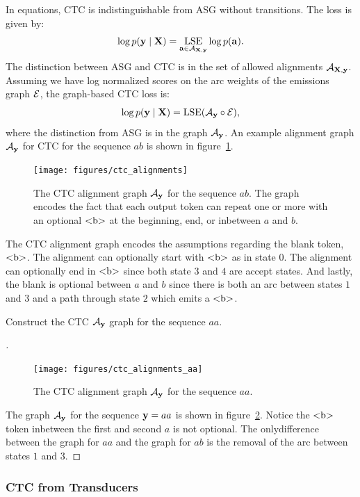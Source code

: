 In equations, CTC is indistinguishable from ASG without transitions. The loss
is given by:
$$
\log p({\bf y} \mid {\bf X}) = \operatorname*{\textrm{LSE}}_{{\bf a} \in \mathcal{A}_{{\bf X}, {\bf y}}} \log p({\bf a}).
$$
The distinction between ASG and CTC is in the set of allowed alignments
$\mathcal{A}_{{\bf X}, {\bf y}}$. Assuming we have log normalized scores on the arc weights of
the emissions graph $\mathcal{E}$, the graph-based CTC loss is:
$$
\log p({\bf y} \mid {\bf X}) = \operatorname*{\textrm{LSE}}(\mathcal{A}_{\bf y} \circ \mathcal{E}),
$$
where the distinction from ASG is in the graph $\mathcal{A}_{\bf y}$. An example alignment
graph $\mathcal{A}_{\bf y}$ for CTC for the sequence $ab$ is shown in
figure~\ref{fig:ctc_alignments}.

\begin{figure}
    \centering
    \texttt{[image: figures/ctc\_alignments]}
    \caption{The CTC alignment graph $\mathcal{A}_{\bf y}$ for the sequence $ab$. The graph
    encodes the fact that each output token can repeat one or more with an
    optional $\textrm{<b>}$ at the beginning, end, or inbetween $a$ and $b$.}
    \label{fig:ctc_alignments}
\end{figure}

The CTC alignment graph encodes the assumptions regarding the blank
token, $\textrm{<b>}$. The alignment can optionally start with $\textrm{<b>}$ as in state
$0$. The alignment can optionally end in $\textrm{<b>}$ since both state $3$ and $4$
are accept states. And lastly, the blank is optional between $a$ and $b$ since
there is both an arc between states $1$ and $3$ and a path through state $2$
which emits a $\textrm{<b>}$.

\begin{example}
Construct the CTC $\mathcal{A}_{\bf y}$ graph for the sequence $aa$.
\end{example}

\begin{proof}[\unskip\nopunct]

\begin{figure}
    \centering
    \texttt{[image: figures/ctc\_alignments\_aa]}
    \caption{The CTC alignment graph $\mathcal{A}_{\bf y}$ for the sequence $aa$.}
    \label{fig:ctc_alignments_aa}
\end{figure}

The graph $\mathcal{A}_{\bf y}$ for the sequence ${\bf y} = aa$ is shown in
figure~\ref{fig:ctc_alignments_aa}. Notice the $\textrm{<b>}$ token inbetween the
first and second $a$ is not optional. The onlydifference between the graph
for $aa$ and the graph for $ab$ is the removal of the arc between states
$1$ and $3$.
\end{proof}

\subsubsection{CTC from Transducers}

